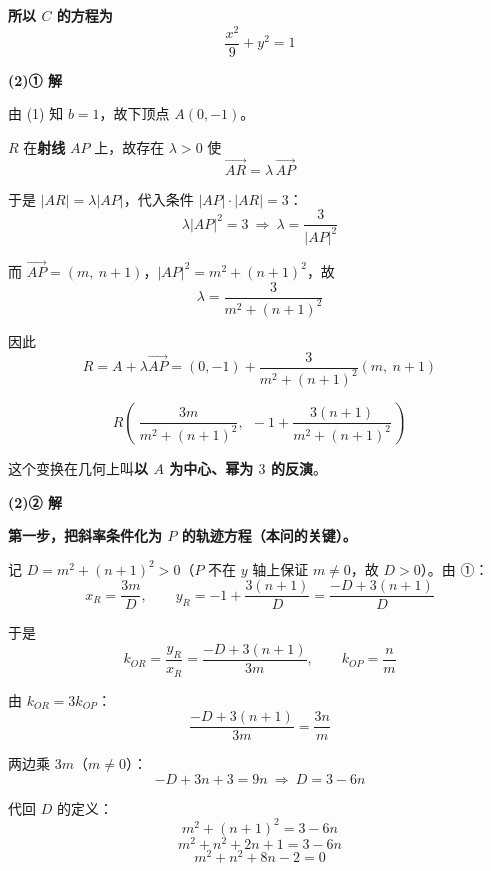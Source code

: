 \begin{answer}
\textbf{所以 $C$ 的方程为}
\nopagebreak[4]
\[\frac{x^2}{9}+y^2=1\]

\par\medskip

\textbf{(2)① 解}

由 (1) 知 $b=1$，故下顶点 $A(0,-1)$。

$R$ 在\textbf{射线} $AP$ 上，故存在 $\lambda>0$ 使
\nopagebreak[4]
\[\overrightarrow{AR}=\lambda\,\overrightarrow{AP}\]

于是 $|AR|=\lambda|AP|$，代入条件 $|AP|\cdot|AR|=3$：
\nopagebreak[4]
\[\lambda\left|AP\right|^2=3\ \Longrightarrow\ \lambda=\frac{3}{\left|AP\right|^2}\]

而 $\overrightarrow{AP}=(m,\ n+1)$，$\left|AP\right|^2=m^2+(n+1)^2$，故
\nopagebreak[4]
\[\lambda=\frac{3}{m^2+(n+1)^2}\]

因此
\nopagebreak[4]
\[R=A+\lambda\overrightarrow{AP}=\left(0,-1\right)+\frac{3}{m^2+(n+1)^2}\left(m,\ n+1\right)\]

\nopagebreak[4]
\[\boxed{R\left(\ \frac{3m}{m^2+(n+1)^2},\ \ -1+\frac{3(n+1)}{m^2+(n+1)^2}\ \right)}\]

\begin{gktip}
这个变换在几何上叫\textbf{以 $A$ 为中心、幂为 $3$ 的反演}。
\end{gktip}

\par\medskip

\textbf{(2)② 解}

\textbf{第一步，把斜率条件化为 $P$ 的轨迹方程（本问的关键）。}

记 $D=m^2+(n+1)^2>0$（$P$ 不在 $y$ 轴上保证 $m\ne0$，故 $D>0$）。由 ①：
\nopagebreak[4]
\[x_R=\frac{3m}{D},\qquad y_R=-1+\frac{3(n+1)}{D}=\frac{-D+3(n+1)}{D}\]

于是
\nopagebreak[4]
\[k_{OR}=\frac{y_R}{x_R}=\frac{-D+3(n+1)}{3m},\qquad k_{OP}=\frac nm\]

由 $k_{OR}=3k_{OP}$：
\nopagebreak[4]
\[\frac{-D+3(n+1)}{3m}=\frac{3n}{m}\]

两边乘 $3m$（$m\ne0$）：
\nopagebreak[4]
\[-D+3n+3=9n\ \Longrightarrow\ D=3-6n\]

代回 $D$ 的定义：
\nopagebreak[4]
\[m^2+(n+1)^2=3-6n\]
\nopagebreak[4]
\[m^2+n^2+2n+1=3-6n\]
\nopagebreak[4]
\[m^2+n^2+8n-2=0\]


\end{answer}
